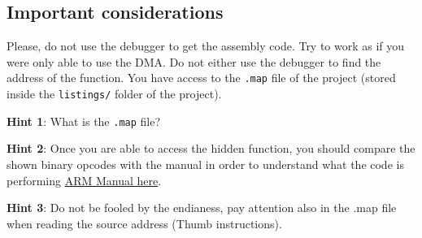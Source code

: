 \documentclass[a4paper]{article}
\begin{document}
\subsection{Important considerations}
Please, do not use the debugger to get the assembly code. Try to work as if you were only able to use the DMA.
Do not either use the debugger to find the address of the function. You have access to the \texttt{.map} file of the project (stored inside the \texttt{listings/} folder of the project).  


\textbf{Hint 1}: What is the \texttt{.map} file? 

\textbf{Hint 2}: Once you are able to access the hidden function, you should compare the shown binary opcodes with the manual in order to understand what the code is performing 
\href{http://bear.ces.cwru.edu/eecs_382/ARM7-TDMI-manual-pt3.pdf}{ARM Manual here}.

\textbf{Hint 3}: Do not be fooled by the endianess, pay attention also in the .map file when reading the source address (Thumb instructions). 


\doclicenseThis
\bigskip

\end{document}
